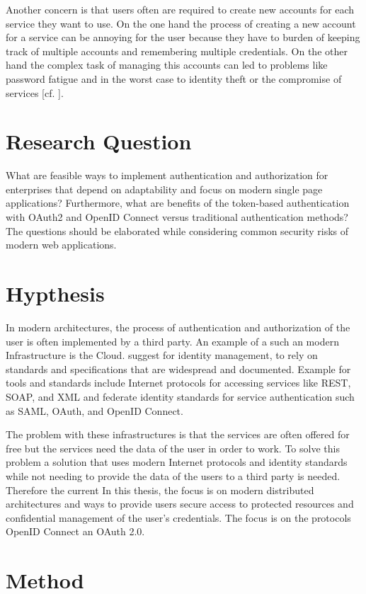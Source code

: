 Another concern is that users often are required to create new accounts for each service they want to use. On the one hand the process of creating a new account for a service can be annoying for the user because they have to burden of keeping track of multiple accounts and remembering multiple credentials. On the other hand the complex task of managing this accounts can led to problems like password fatigue and in the worst case to identity theft or the compromise of services [cf. \cite{Sakimura:OIDCC}].


\section{Research Question}
What are feasible ways to implement authentication and authorization for enterprises that depend on adaptability and focus on modern single page applications? Furthermore, what are benefits of the token-based authentication with OAuth2 and OpenID Connect versus traditional authentication methods? The questions should be elaborated while considering common security risks of modern web applications.

\section{Hypthesis}

In modern architectures, the process of authentication and authorization of the user is often implemented by a third party. An example of a such an modern Infrastructure is the Cloud. \cite{NIST:2017:DIG} suggest for identity management, to rely on standards and specifications that are widespread and documented. Example for tools and standards include Internet protocols for accessing services like REST, SOAP, and XML and federate identity standards for service authentication such as SAML, OAuth, and OpenID Connect.

The problem with these infrastructures is that the services are often offered for free but the services need the data of the user in order to work. To solve this problem a solution that uses modern Internet protocols and identity standards while not needing to provide the data of the users to a third party is needed. Therefore the current 
In this thesis, the focus is on modern distributed architectures and ways to provide users secure access to protected resources and confidential management of the user’s credentials. The focus is on the protocols OpenID Connect an OAuth 2.0. 


\section{Method}

